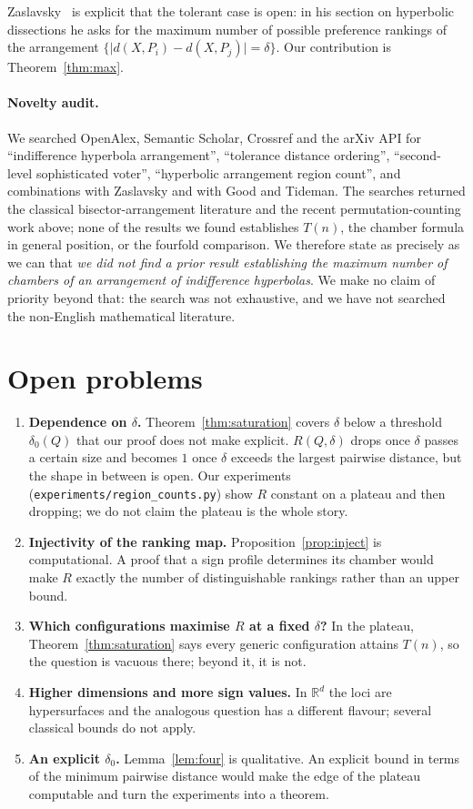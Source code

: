 ﻿\documentclass[11pt,a4paper]{article}
\theoremstyle{definition}
\theoremstyle{remark}
\newcommand{\RR}{\mathbb{R}}
\begin{document}
Zaslavsky~\cite{zaslavsky2002} is explicit that the tolerant case is open: in
his section on hyperbolic dissections he asks for the maximum number of possible
preference rankings of the arrangement $\{\bigl|d(X,P_i)-d(X,P_j)\bigr|=\delta\}$.
Our contribution is Theorem~\ref{thm:max}.

\paragraph{Novelty audit.}
We searched OpenAlex, Semantic Scholar, Crossref and the arXiv API for
``indifference hyperbola arrangement'', ``tolerance distance ordering'',
``second-level sophisticated voter'', ``hyperbolic arrangement region count'',
and combinations with Zaslavsky and with Good and Tideman.  The searches returned
the classical bisector-arrangement literature and the recent permutation-counting
work above; none of the results we found establishes $T(n)$, the chamber formula
in general position, or the fourfold comparison.  We therefore state as precisely
as we can that \emph{we did not find a prior result establishing the maximum
number of chambers of an arrangement of indifference hyperbolas}.  We make no
claim of priority beyond that: the search was not exhaustive, and we have not
searched the non-English mathematical literature.

\section{Open problems}
\label{sec:open}

\begin{enumerate}[leftmargin=*,itemsep=3pt]
\item \textbf{Dependence on $\delta$.}  Theorem~\ref{thm:saturation} covers
  $\delta$ below a threshold $\delta_0(Q)$ that our proof does not make explicit.
  $R(Q,\delta)$ drops once $\delta$ passes a certain size and becomes $1$ once
  $\delta$ exceeds the largest pairwise distance, but the shape in between is
  open.  Our experiments (\texttt{experiments/region\_counts.py}) show $R$
  constant on a plateau and then dropping; we do not claim the plateau is the
  whole story.
\item \textbf{Injectivity of the ranking map.}  Proposition~\ref{prop:inject} is
  computational.  A proof that a sign profile determines its chamber would make
  $R$ exactly the number of distinguishable rankings rather than an upper bound.
\item \textbf{Which configurations maximise $R$ at a fixed $\delta$?}  In the
  plateau, Theorem~\ref{thm:saturation} says every generic configuration attains
  $T(n)$, so the question is vacuous there; beyond it, it is not.
\item \textbf{Higher dimensions and more sign values.}  In $\RR^d$ the loci are
  hypersurfaces and the analogous question has a different flavour; several
  classical bounds do not apply.
\item \textbf{An explicit $\delta_0$.}  Lemma~\ref{lem:four} is qualitative.  An
  explicit bound in terms of the minimum pairwise distance would make the edge of
  the plateau computable and turn the experiments into a theorem.
\end{enumerate}
\end{document}
